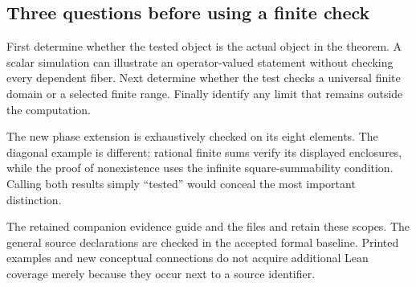 \subsection{Three questions before using a finite check}
First determine whether the tested object is the actual object in the theorem. A scalar simulation can illustrate an operator-valued statement without checking every dependent fiber. Next determine whether the test checks a universal finite domain or a selected finite range. Finally identify any limit that remains outside the computation.

The new phase extension is exhaustively checked on its eight elements. The diagonal example is different: rational finite sums verify its displayed enclosures, while the proof of nonexistence uses the infinite square-summability condition. Calling both results simply ``tested'' would conceal the most important distinction.

The retained companion evidence guide and the files  and  retain these scopes. The general source declarations are checked in the accepted formal baseline. Printed examples and new conceptual connections do not acquire additional Lean coverage merely because they occur next to a source identifier.
